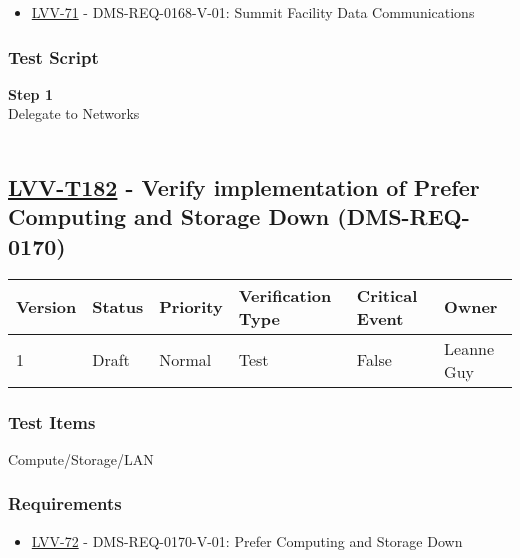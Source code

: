\begin{itemize}
\tightlist
\item
  \href{https://jira.lsstcorp.org/browse/LVV-71}{LVV-71} -
  DMS-REQ-0168-V-01: Summit Facility Data Communications
\end{itemize}

\hypertarget{test-script-158}{%
\subsubsection{Test Script}\label{test-script-158}}

\textbf{Step 1}\\
Delegate to Networks\\
~\\

\hypertarget{lvv-t182---verify-implementation-of-prefer-computing-and-storage-down-dms-req-0170}{%
\subsection{\texorpdfstring{\href{https://jira.lsstcorp.org/secure/Tests.jspa\#/testCase/LVV-T182}{LVV-T182}
- Verify implementation of Prefer Computing and Storage Down
(DMS-REQ-0170)}{LVV-T182 - Verify implementation of Prefer Computing and Storage Down (DMS-REQ-0170)}}\label{lvv-t182---verify-implementation-of-prefer-computing-and-storage-down-dms-req-0170}}

\begin{longtable}[]{@{}llllll@{}}
\toprule
Version & Status & Priority & Verification Type & Critical Event &
Owner\tabularnewline
\midrule
\endhead
1 & Draft & Normal & Test & False & Leanne Guy\tabularnewline
\bottomrule
\end{longtable}

\hypertarget{test-items-158}{%
\subsubsection{Test Items}\label{test-items-158}}

Compute/Storage/LAN~

\hypertarget{requirements-159}{%
\subsubsection{Requirements}\label{requirements-159}}

\begin{itemize}
\tightlist
\item
  \href{https://jira.lsstcorp.org/browse/LVV-72}{LVV-72} -
  DMS-REQ-0170-V-01: Prefer Computing and Storage Down
\end{itemize}

